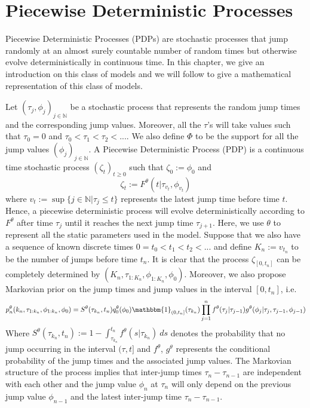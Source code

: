 \documentclass[12pt,a4paper]{article}
\begin{document}
\section{Piecewise Deterministic Processes}
Piecewise Deterministic Processes (PDPs) are stochastic processes that jump randomly at an almost surely countable number of random times but otherwise evolve deterministically in continuous time. In this chapter, we give an introduction on this class of models and we will follow to give a mathematical representation of this class of models.

Let $(\tau_j,\phi_j)_{j \in \mathbb{N}}$ be a stochastic process that represents the random jump times and the corresponding jump values. Moreover, all the $\tau$'s will take values such that $\tau_0 = 0$ and $\tau_0<\tau_1<\tau_2<...$. We also define $\Phi$ to be the support for all the jump values $(\phi_j)_{j \in \mathbb{N}}$. A Piecewise Deterministic Process (PDP) is a continuous time stochastic process $(\zeta_t)_{t \geq 0}$ such that $\zeta_0 := \phi_0$ and 
$$\zeta_t := F^{\theta}(t|\tau_{v_t},\phi_{v_t})$$
where $v_t := \sup \{j \in \mathbb{N}|\tau_j \leq t \}$ represents the latest jump time before time $t$. Hence, a piecewise deterministic process will evolve deterministically according to $F^{\theta}$ after time $\tau_{j}$ until it reaches the next jump time $\tau_{j+1}$. Here, we use $\theta$ to represent all the static parameters used in the model. Suppose that we also have a sequence of known discrete times $0=t_0<t_1<t_2<...$ and define $K_n := v_{t_n}$ to be the number of jumps before time $t_n$. It is clear that the process $\zeta_{[0,t_n]}$ can be completely determined by $\left(K_n,\tau_{1:K_n},\phi_{1:K_n},\phi_0\right)$. Moreover, we also propose Markovian prior on the jump times and jump values in the interval $[0,t_n]$, i.e.
\begin{equation}
\label{eqn:Chap1-PDMP-Prior}
    p_n^{\theta}(k_n,\tau_{1:k_n},\phi_{1:k_n},\phi_0) = S^{\theta}(\tau_{k_n},t_n)q_0^{\theta}(\phi_0)\mathbbm{1}_{(0,t_n]}(\tau_{k_n})\prod_{j=1}^{n} f^{\theta}(\tau_j|\tau_{j-1}) g^{\theta}(\phi_j|\tau_j,\tau_{j-1},\phi_{j-1})
\end{equation}
Where $S^{\theta}(\tau_{k_n},t_n):= 1- \int_{\tau_{k_n}}^{t_n} f^{\theta}(s|\tau_{k_n})\ ds$ denotes the probability that no jump occurring in the interval $(\tau,t]$ and $f^{\theta}$, $g^{\theta}$ represents the conditional probability of the jump times and the associated jump values. The Markovian structure of the process implies that inter-jump times $\tau_n - \tau_{n-1}$ are independent with each other and the jump value $\phi_n$ at $\tau_n$ will only depend on the previous 
jump value $\phi_{n-1}$ and the latest inter-jump time $\tau_n - \tau_{n-1}$.
\end{document}
